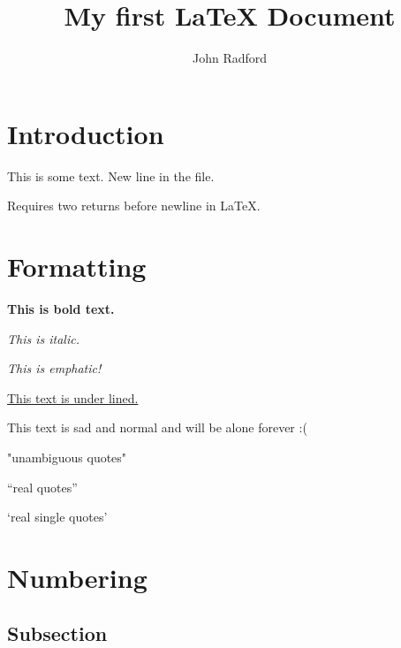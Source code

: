 \documentclass{article}
\author{John Radford}
\title{My first {\LaTeX} Document}
\begin{document}
\maketitle

\section{Introduction}

This is some text.
New line in the file. 

Requires two returns before newline in {\LaTeX}.

\section{Formatting}

\textbf{This is bold text.}

\textit{This is italic.}

\emph{This is emphatic!}

\underline{This text is under lined.}

This text is sad and normal and will be alone forever :(

"unambiguous quotes"

``real quotes''

`real single quotes'

\section{Numbering}

\subsection{Subsection}
\end{document}

